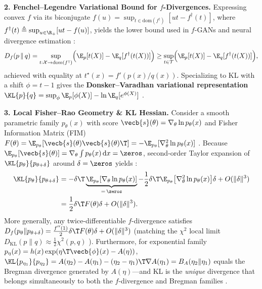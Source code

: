 \documentclass[../../../../master.tex]{subfiles}
\begin{document}
\begin{coremath}
\textbf{2. Fenchel--Legendre Variational Bound for $f$-Divergences.} Expressing convex $f$ via its biconjugate $f(u) = \sup_{t \in \mathrm{dom}(f^\dagger)} [ut - f^\dagger(t)]$, where $f^\dagger(t) \triangleq \sup_{u \in \R_+} [ut - f(u)]$, yields the lower bound used in $f$-GANs and neural divergence estimation :
\begin{equation}
\label{eq:infotheory:fenchel_fdiv}
  D_f(p \,\|\, q)
  = \sup_{t:\mathcal{X} \to \mathrm{dom}(f^\dagger)} \Bigl(\E_{p}[t(X)] - \E_{q}[f^\dagger(t(X))]\Bigr)
  \ge \sup_{t \in \mathcal{T}} \Bigl(\E_{p}[t(X)] - \E_{q}[f^\dagger(t(X))]\Bigr),
\end{equation}
achieved with equality at $t^\star(x) = f'(p(x)/q(x))$. Specializing to KL with a shift $\phi = t - 1$ gives the \textbf{Donsker--Varadhan variational representation} $\KL{p}{q} = \sup_{\phi} \E_p[\phi(X)] - \ln \E_q[e^{\phi(X)}]$ .

\textbf{3. Local Fisher--Rao Geometry \& KL Hessian.} Consider a smooth parametric family $p_\theta(x)$ with score $\vecb{s}(\theta) = \nabla_\theta \ln p_\theta(x)$ and Fisher Information Matrix (FIM) $F(\theta) = \E_{p_\theta}[\vecb{s}(\theta)\vecb{s}(\theta)\T] = -\E_{p_\theta}[\nabla_\theta^2 \ln p_\theta(x)]$ . Because $\E_{p_\theta}[\vecb{s}(\theta)] = \nabla_\theta \int p_\theta(x)\,\mathrm{d}x = \zeros$, second-order Taylor expansion of $\KL{p_\theta}{p_{\theta + \delta}}$ around $\delta = \zeros$ yields :
\begin{equation}
\label{eq:infotheory:fisher_kl}
\begin{aligned}
  \KL{p_\theta}{p_{\theta + \delta}}
  &= -\delta\T \underbrace{\E_{p_\theta}[\nabla_\theta \ln p_\theta(x)]}_{=\,\zeros}
     - \frac{1}{2}\delta\T \E_{p_\theta}\bigl[\nabla_\theta^2 \ln p_\theta(x)\bigr]\delta + O(\|\delta\|^3) \\
  &= \frac{1}{2}\delta\T F(\theta)\delta + O(\|\delta\|^3).
\end{aligned}
\end{equation}
More generally, any twice-differentiable $f$-divergence satisfies $D_f(p_\theta \| p_{\theta+\delta}) = \frac{f''(1)}{2}\delta\T F(\theta)\delta + O(\|\delta\|^3)$ (matching the $\chi^2$ local limit $D_{\mathrm{KL}}(p\|q) \approx \frac{1}{2}\chi^2(p, q)$ ). Furthermore, for exponential family $p_\eta(x) = h(x)\exp(\eta\T \vecb{\phi}(x) - A(\eta))$, $\KL{p_{\eta_1}}{p_{\eta_2}} = A(\eta_2) - A(\eta_1) - (\eta_2 - \eta_1)\T \nabla A(\eta_1) = B_A(\eta_2 \| \eta_1)$ equals the Bregman divergence generated by $A(\eta)$---and KL is the \emph{unique} divergence that belongs simultaneously to both the $f$-divergence and Bregman families .
\end{coremath}
\end{document}
